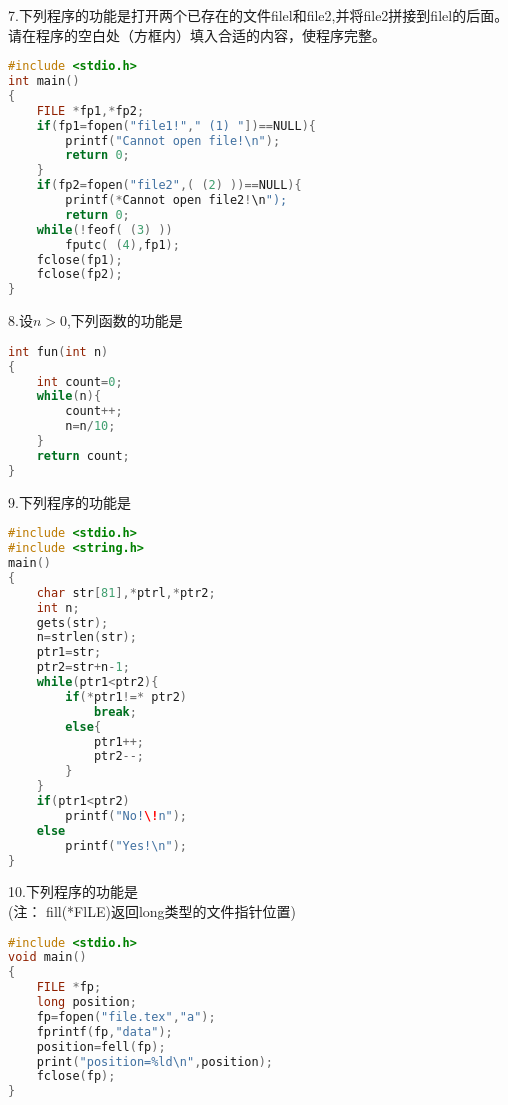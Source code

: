 7.下列程序的功能是打开两个已存在的文件filel和file2,并将file2拼接到filel的后面。 \\
请在程序的空白处（方框内）填入合适的内容，使程序完整。
\begin{lstlisting}[language=cpp]
#include <stdio.h>
int main()
{
    FILE *fp1,*fp2;
    if(fp1=fopen("file1!"," (1) "])==NULL){
        printf("Cannot open file!\n");
        return 0;
    }
    if(fp2=fopen("file2",( (2) ))==NULL){
        printf(*Cannot open file2!\n");
        return 0;
    while(!feof( (3) ))
        fputc( (4),fp1);
    fclose(fp1);
    fclose(fp2);
}
\end{lstlisting}

8.设$n>0$,下列函数的功能是  \\
\begin{lstlisting}[language=cpp]
int fun(int n)
{
    int count=0;
    while(n){
        count++;
        n=n/10;
    }
    return count;
}
\end{lstlisting}

9.下列程序的功能是 \\
\begin{lstlisting}[language=cpp]
#include <stdio.h>
#include <string.h>
main()
{
    char str[81],*ptrl,*ptr2;
    int n;
    gets(str);
    n=strlen(str);
    ptr1=str;
    ptr2=str+n-1;
    while(ptr1<ptr2){
        if(*ptr1!=* ptr2)
            break;
        else{
            ptr1++;
            ptr2--;
        }
    }
    if(ptr1<ptr2)
        printf("No!\!n");
    else
        printf("Yes!\n");
}
\end{lstlisting}

10.下列程序的功能是 \\
(注： fill(*FlLE)返回long类型的文件指针位置)
\begin{lstlisting}[language=cpp]
#include <stdio.h>
void main()
{
    FILE *fp;
    long position;
    fp=fopen("file.tex","a");
    fprintf(fp,"data");
    position=fell(fp);
    print("position=%ld\n",position);
    fclose(fp);
}
\end{lstlisting}
